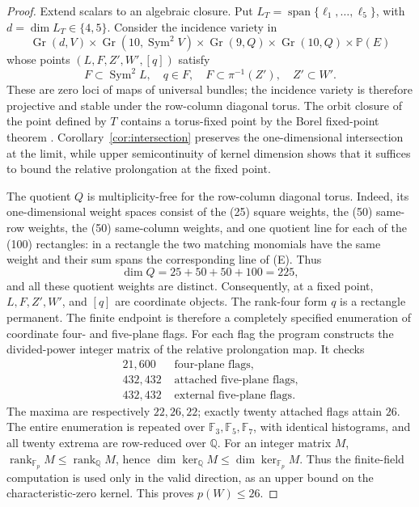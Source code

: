 \documentclass[11pt,reqno]{amsart}
\theoremstyle{definition}
\newcommand{\Q}{\mathbb Q}
\newcommand{\F}{\mathbb F}
\newcommand{\Sym}{\operatorname{Sym}}
\newcommand{\rank}{\operatorname{rank}}
\newcommand{\Span}{\operatorname{span}}
\newcommand{\Gr}{\operatorname{Gr}}
\begin{document}
\begin{proof}
Extend scalars to an algebraic closure. Put
\(L_T=\Span\{\ell_1,\ldots,\ell_5\}\), with
\(d=\dim L_T\in\{4,5\}\). Consider the incidence variety in
\[
 \Gr(d,V)\times\Gr(10,\Sym^2V)\times\Gr(9,Q)
 \times\Gr(10,Q)\times\mathbb P(E)
\]
whose points \((L,F,Z',W',[q])\) satisfy
\begin{equation}\label{eq:incidence}
 F\subset\Sym^2L,\quad q\in F,\quad
 F\subset\pi^{-1}(Z'),\quad Z'\subset W'.
\end{equation}
These are zero loci of maps of universal bundles; the incidence variety is
therefore projective and stable under the row-column diagonal torus. The orbit
closure of the point defined by \(T\) contains a torus-fixed point by the Borel
fixed-point theorem \cite[Chapter~I, Theorem~4.7]{Borel1991}.
Corollary~\ref{cor:intersection} preserves the
one-dimensional intersection at the limit, while upper semicontinuity of
kernel dimension shows that it suffices to bound the relative prolongation at
the fixed point.

The quotient \(Q\) is multiplicity-free for the row-column diagonal torus.
Indeed, its one-dimensional weight spaces consist of the (25) square
weights, the (50) same-row weights, the (50) same-column weights, and one
quotient line for each of the (100) rectangles: in a rectangle the two
matching monomials have the same weight and their sum spans the corresponding
line of (E). Thus
\[
 \dim Q=25+50+50+100=225,
\]
and all these quotient weights are distinct. Consequently, at a fixed point,
\(L,F,Z',W'\), and \([q]\) are coordinate objects. The rank-four form \(q\)
is a rectangle permanent. The finite endpoint is therefore a completely
specified enumeration of coordinate four- and five-plane flags.
For each flag the program constructs the divided-power integer matrix of the
relative prolongation map. It checks
\begin{align*}
 21{,}600&\text{ four-plane flags},\\
 432{,}432&\text{ attached five-plane flags},\\
 432{,}432&\text{ external five-plane flags}.
\end{align*}
The maxima are respectively \(22,26,22\); exactly twenty attached flags attain
\(26\). The entire enumeration is repeated over \(\F_3,\F_5,\F_7\), with
identical histograms, and all twenty extrema are row-reduced over \(\Q\).
For an integer matrix \(M\), \(\rank_{\F_p}M\le\rank_{\Q}M\), hence
\(\dim\ker_{\Q}M\le\dim\ker_{\F_p}M\). Thus the finite-field computation is
used only in the valid direction, as an upper bound on the characteristic-zero
kernel. This proves \(p(W)\le26\).
\end{proof}
\end{document}
